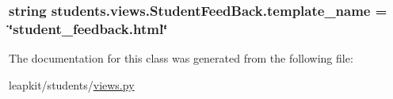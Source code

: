 \hypertarget{classstudents_1_1views_1_1_student_feed_back_aba4fdf3ecec134b999393bbd6d402a25}{
\subsubsection[{template\-\_\-name}]{\setlength{\rightskip}{0pt plus 5cm}string students.\-views.\-Student\-Feed\-Back.\-template\-\_\-name = \char`\"{}student\-\_\-feedback.\-html\char`\"{}\hspace{0.3cm}{\ttfamily [static]}}}\label{classstudents_1_1views_1_1_student_feed_back_aba4fdf3ecec134b999393bbd6d402a25}


The documentation for this class was generated from the following file\-:\begin{DoxyCompactItemize}
\item 
leapkit/students/\hyperlink{views_8py}{views.\-py}\end{DoxyCompactItemize}
